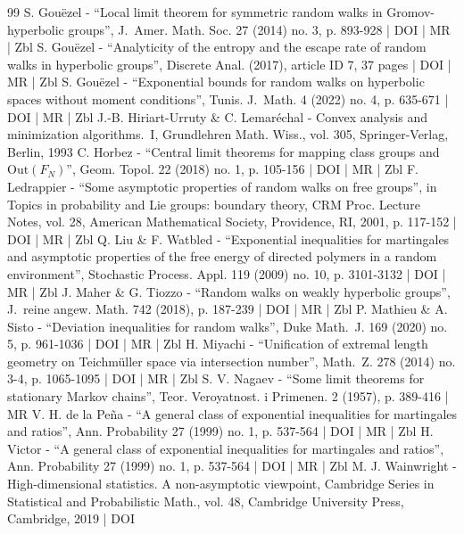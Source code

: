 \documentclass[10pt]{amsart}
\theoremstyle{plain}
\theoremstyle{definition}
\begin{document}
\begin{thebibliography}{99}
S. Gouëzel - “Local limit theorem for symmetric random walks in Gromov-hyperbolic groups”, J. Amer. Math. Soc. 27 (2014) no. 3, p. 893-928 | DOI | MR | Zbl
S. Gouëzel - “Analyticity of the entropy and the escape rate of random walks in hyperbolic groups”, Discrete Anal. (2017), article ID 7, 37 pages | DOI | MR | Zbl
S. Gouëzel - “Exponential bounds for random walks on hyperbolic spaces without moment conditions”, Tunis. J. Math. 4 (2022) no. 4, p. 635-671 | DOI | MR | Zbl
J.-B. Hiriart-Urruty \& C. Lemaréchal - Convex analysis and minimization algorithms. I, Grundlehren Math. Wiss., vol. 305, Springer-Verlag, Berlin, 1993
C. Horbez - “Central limit theorems for mapping class groups and $\mathrm{Out}(F_N)$”, Geom. Topol. 22 (2018) no. 1, p. 105-156 | DOI | MR | Zbl
F. Ledrappier - “Some asymptotic properties of random walks on free groups”, in Topics in probability and Lie groups: boundary theory, CRM Proc. Lecture Notes, vol. 28, American Mathematical Society, Providence, RI, 2001, p. 117-152 | DOI | MR | Zbl
Q. Liu \& F. Watbled - “Exponential inequalities for martingales and asymptotic properties of the free energy of directed polymers in a random environment”, Stochastic Process. Appl. 119 (2009) no. 10, p. 3101-3132 | DOI | MR | Zbl
J. Maher \& G. Tiozzo - “Random walks on weakly hyperbolic groups”, J. reine angew. Math. 742 (2018), p. 187-239 | DOI | MR | Zbl
P. Mathieu \& A. Sisto - “Deviation inequalities for random walks”, Duke Math. J. 169 (2020) no. 5, p. 961-1036 | DOI | MR | Zbl
H. Miyachi - “Unification of extremal length geometry on Teichmüller space via intersection number”, Math. Z. 278 (2014) no. 3-4, p. 1065-1095 | DOI | MR | Zbl
S. V. Nagaev - “Some limit theorems for stationary Markov chains”, Teor. Veroyatnost. i Primenen. 2 (1957), p. 389-416 | MR
V. H. de la Peña - “A general class of exponential inequalities for martingales and ratios”, Ann. Probability 27 (1999) no. 1, p. 537-564 | DOI | MR | Zbl
H. Victor - “A general class of exponential inequalities for martingales and ratios”, Ann. Probability 27 (1999) no. 1, p. 537-564 | DOI | MR | Zbl
M. J. Wainwright - High-dimensional statistics. A non-asymptotic viewpoint, Cambridge Series in Statistical and Probabilistic Math., vol. 48, Cambridge University Press, Cambridge, 2019 | DOI
\end{thebibliography}
\end{document}
